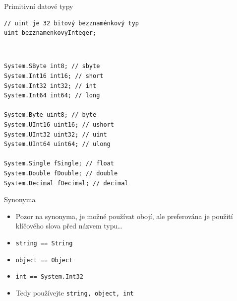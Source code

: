 

\begin{frame}[fragile]
\vfill
\begin{exampleblock}{Primitivní datové typy}
\begin{lstlisting}
// uint je 32 bitový bezznaménkový typ
uint bezznamenkovyInteger;
\end{lstlisting}
\end{exampleblock}
\vfill
\begin{bonusblock}{~}
\begin{lstlisting}
System.SByte int8; // sbyte
System.Int16 int16; // short
System.Int32 int32; // int
System.Int64 int64; // long

System.Byte uint8; // byte
System.UInt16 uint16; // ushort
System.UInt32 uint32; // uint
System.UInt64 uint64; // ulong

System.Single fSingle; // float
System.Double fDouble; // double
System.Decimal fDecimal; // decimal
\end{lstlisting}
\end{bonusblock}
\vfill
\end{frame}


\begin{frame}[fragile]
\begin{block}{Synonyma}
\begin{itemize}
\item Pozor na synonyma, je možné používat obojí, ale preferována je použití klíčového slova před názvem typu\ldots
\item \lstinline|string == String|
\item \lstinline|object == Object|
\item \lstinline|int == System.Int32|
\item Tedy používejte \lstinline|string, object, int|
\end{itemize}
\end{block}
\end{frame}

